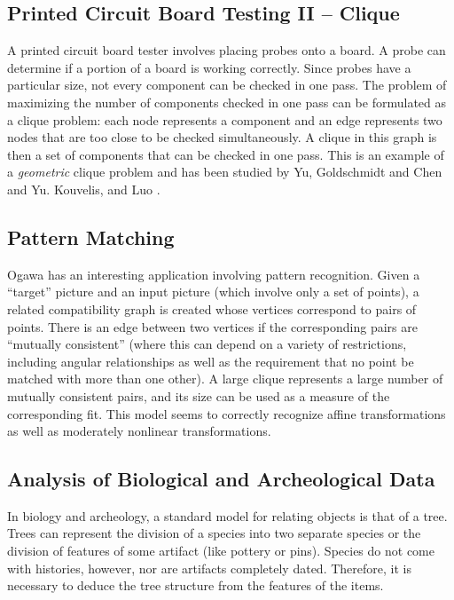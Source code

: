 \subsection{Printed Circuit Board Testing II -- Clique}  A printed
circuit board tester involves placing probes onto a board.  A probe
can determine if a portion of a board is working correctly.  Since
probes have a particular size, not every component can be checked in
one pass.  The problem of maximizing the number of components checked
in one pass can be formulated as a clique problem:  each node
represents a component and an edge represents two nodes that are too
close to be checked simultaneously.  A clique in this graph is then a
set of components that can be checked in one pass.  This is an example
of a {\it geometric} clique problem and has been studied by Yu,
Goldschmidt and Chen \cite{YGC92} and Yu. Kouvelis, and Luo
\cite{YKL92}.

\subsection{Pattern Matching} Ogawa \cite{Og86} has an interesting
application involving pattern recognition.  Given a ``target'' picture
and an input picture (which involve only a set of points), a related
compatibility graph is created whose vertices correspond to pairs of points.
There is an edge between two vertices if the corresponding pairs are
``mutually consistent'' (where this can depend on a variety of restrictions,
including angular relationships as well as the requirement that no
point be matched with more than one other).  A large clique represents a
large number of mutually consistent pairs, and its size can be used as
a measure of the corresponding fit.  This model seems to correctly recognize
affine transformations as well as moderately nonlinear
transformations.

\subsection{Analysis of Biological and Archeological Data}  In biology
and archeology, a standard model for relating objects is that of a
tree.  Trees can represent the division of a species into two separate
species or the division of features of some artifact (like pottery or
pins).  Species do not come with histories, however, nor are artifacts
completely dated.  Therefore, it is necessary to deduce the tree
structure from the features of the items.  

